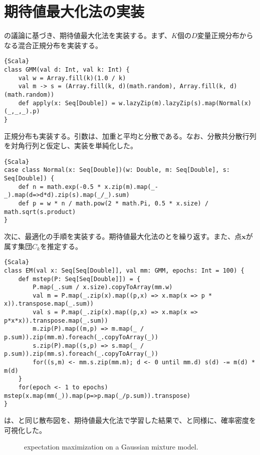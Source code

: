 \documentclass[10pt,a4paper]{book}
\begin{document}
\section{期待値最大化法の実装}

の議論に基づき、期待値最大化法を実装する。まず、$K$個の$D$変量正規分布からなる混合正規分布を実装する。

\begin{Verbatim}{Scala}
class GMM(val d: Int, val k: Int) {
	val w = Array.fill(k)(1.0 / k)
	val m -> s = (Array.fill(k, d)(math.random), Array.fill(k, d)(math.random))
	def apply(x: Seq[Double]) = w.lazyZip(m).lazyZip(s).map(Normal(x)(_,_,_).p)
}
\end{Verbatim}

正規分布も実装する。引数は、加重と平均と分散である。なお、分散共分散行列を対角行列と仮定し、実装を単純化した。

\begin{Verbatim}{Scala}
case class Normal(x: Seq[Double])(w: Double, m: Seq[Double], s: Seq[Double]) {
	def n = math.exp(-0.5 * x.zip(m).map(_-_).map(d=>d*d).zip(s).map(_/_).sum)
	def p = w * n / math.pow(2 * math.Pi, 0.5 * x.size) / math.sqrt(s.product)
}
\end{Verbatim}

次に、最適化の手順を実装する。期待値最大化法の\Estep{}と\Mstep{}を繰り返す。また、点$\bm{x}$が属す集団$C_k$を推定する。

\begin{Verbatim}{Scala}
class EM(val x: Seq[Seq[Double]], val mm: GMM, epochs: Int = 100) {
	def mstep(P: Seq[Seq[Double]]) = {
		P.map(_.sum / x.size).copyToArray(mm.w)
		val m = P.map(_.zip(x).map((p,x) => x.map(x => p * x)).transpose.map(_.sum))
		val s = P.map(_.zip(x).map((p,x) => x.map(x => p*x*x)).transpose.map(_.sum))
		m.zip(P).map((m,p) => m.map(_ / p.sum)).zip(mm.m).foreach(_.copyToArray(_))
		s.zip(P).map((s,p) => s.map(_ / p.sum)).zip(mm.s).foreach(_.copyToArray(_))
		for((s,m) <- mm.s.zip(mm.m); d <- 0 until mm.d) s(d) -= m(d) * m(d)
	}
	for(epoch <- 1 to epochs) mstep(x.map(mm(_)).map(p=>p.map(_/p.sum)).transpose)
}
\end{Verbatim}

は、と同じ散布図を、期待値最大化法で学習した結果で、と同様に、確率密度を可視化した。

\begin{figure}[h]
\centering
{}
\caption{expectation maximization on a Gaussian mixture model.\label{fig:em}}
\end{figure}
\end{document}

